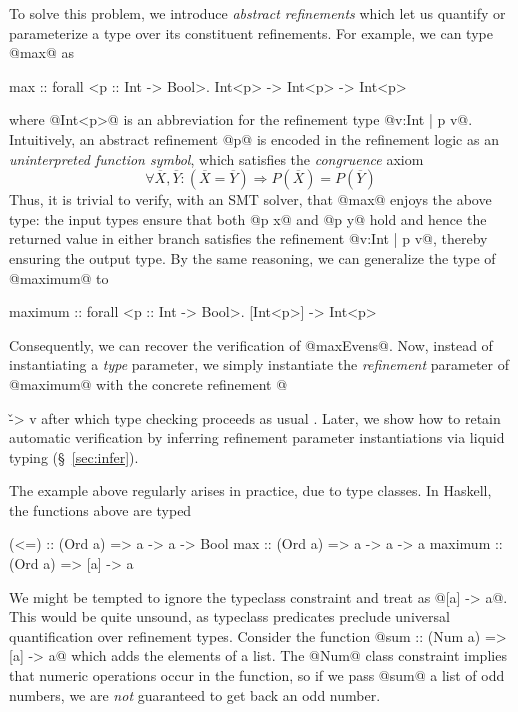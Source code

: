 {{To solve this problem, we introduce \emph{abstract refinements} 
which let us 
quantify or parameterize a type over its constituent refinements.
For example, we can type @max@ as
\begin{code}
  max :: forall <p :: Int -> Bool>. Int<p> -> Int<p> -> Int<p>
\end{code}
where @Int<p>@ is an abbreviation for the refinement type {@{v:Int | p v}@}.
Intuitively, an abstract refinement @p@ is encoded in the refinement logic 
as an \emph{uninterpreted function symbol}, which satisfies the
\emph{congruence} axiom~\cite{Nelson81}
%
$$\forall \overline{X}, \overline{Y}: (\overline{X} = \overline{Y})
\Rightarrow P(\overline{X}) = P(\overline{Y})$$
%
Thus, it is trivial to verify, with an SMT solver, that @max@ 
enjoys the above type: the input types ensure that both @p x@ and @p y@ 
hold and hence the returned value in either branch satisfies 
the refinement  @{v:Int | p v}@, thereby ensuring the output 
type. By the same reasoning, we can generalize the type of @maximum@ 
to
\begin{code}
  maximum :: forall <p :: Int -> Bool>. [Int<p>] -> Int<p>
\end{code}
Consequently, we can recover the verification of @maxEvens@.
Now, instead of instantiating a \emph{type} parameter, we simply instantiate
the \emph{refinement} parameter of @maximum@ with the concrete 
refinement 
@{\v -> v %
after which type checking proceeds as usual \cite{LiquidPLDI08}. 
%
Later, we show how to retain automatic verification by inferring
refinement parameter instantiations via liquid typing
(\S~\ref{sec:infer}).

The example above regularly arises in practice, due to type classes. 
In Haskell, the functions above are typed
%
\begin{code}
  (<=)    :: (Ord a) => a -> a -> Bool
  max     :: (Ord a) => a -> a -> a
  maximum :: (Ord a) => [a] -> a
\end{code}
%
We might be tempted to ignore the typeclass constraint 
and treat  as @[a] -> a@. 
This would be quite unsound, as typeclass predicates preclude
universal quantification over refinement types. 
Consider the function @sum :: (Num a) => [a] -> a@ which adds the elements 
of a list.
The @Num@ class constraint implies that numeric operations occur 
in the function, so
if we pass @sum@ a list of odd numbers, 
we are \emph{not} guaranteed to get back an odd number. 

}}}
